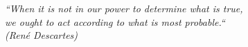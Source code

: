 \begin{epigrafe}
    \vspace*{\fill}
	\begin{flushright}
		\textit{``When it is not in our power to determine what is true,\\
		 we ought to act according to what is most probable.``\\
		(René Descartes)}
	\end{flushright}
\end{epigrafe}